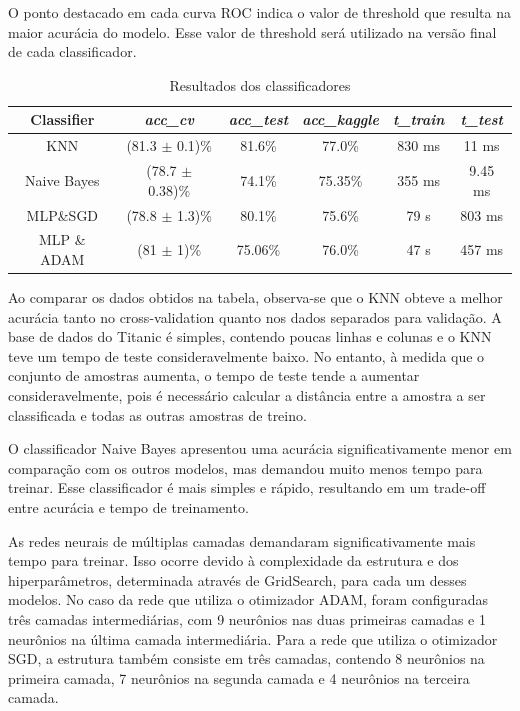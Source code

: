 \documentclass[conference]{IEEEtran}
\begin{document}
\vspace{10pt}

O ponto destacado em cada curva ROC indica o valor de threshold que resulta na maior acurácia do modelo. Esse valor de threshold será utilizado na versão final de cada classificador.

\vspace{10pt}

\begin{table}[htbp]
\caption{Resultados dos classificadores}
\begin{center}
\begin{tabular}{|c|c|c|c|c|c|}
\hline
\textbf{Classifier} & \textbf{\textit{acc\_cv}} & \textbf{\textit{acc\_test}} & \textbf{\textit{acc\_kaggle}} & \textbf{\textit{t\_train}} & \textbf{\textit{t\_test}} \\
\hline
KNN & (81.3 \(\pm\) 0.1)\% & 81.6\% & 77.0\% & 830 ms & 11 ms \\
\hline
Naive Bayes & (78.7 \(\pm\) 0.38)\% & 74.1\% & 75.35\% & 355 ms & 9.45 ms \\
\hline
MLP\&SGD & (78.8 \(\pm\) 1.3)\% & 80.1\% & 75.6\% & 79 s & 803 ms \\
\hline
MLP \& ADAM & (81 \(\pm\) 1)\% & 75.06\% & 76.0\% & 47 s & 457 ms \\
\hline
\end{tabular}
\label{tab1}
\end{center}
\end{table}

\vspace{10pt}


Ao comparar os dados obtidos na tabela, observa-se que o KNN obteve a melhor acurácia tanto no cross-validation quanto nos dados separados para validação. A base de dados do Titanic é simples, contendo poucas linhas e colunas e o KNN teve um tempo de teste consideravelmente baixo. No entanto, à medida que o conjunto de amostras aumenta, o tempo de teste tende a aumentar consideravelmente, pois é necessário calcular a distância entre a amostra a ser classificada e todas as outras amostras de treino.

O classificador Naive Bayes apresentou uma acurácia significativamente menor em comparação com os outros modelos, mas demandou muito menos tempo para treinar. Esse classificador é mais simples e rápido, resultando em um trade-off entre acurácia e tempo de treinamento.

As redes neurais de múltiplas camadas demandaram significativamente mais tempo para treinar. Isso ocorre devido à complexidade da estrutura e dos hiperparâmetros, determinada através de GridSearch, para cada um desses modelos. No caso da rede que utiliza o otimizador ADAM, foram configuradas três camadas intermediárias, com 9 neurônios nas duas primeiras camadas e 1 neurônios na última camada intermediária. Para a rede que utiliza o otimizador SGD, a estrutura também consiste em três camadas, contendo 8 neurônios na primeira camada, 7 neurônios na segunda camada e 4 neurônios na terceira camada. 
\end{document}

